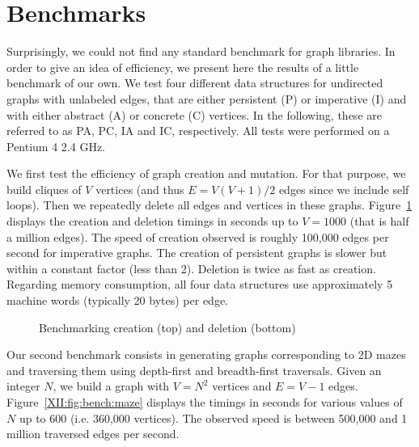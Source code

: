 \section{Benchmarks}\label{XII:bench}

Surprisingly, we could not find any standard benchmark for graph
libraries. In order to give an idea of \ocamlgraph efficiency, we
present here the results of a little benchmark of our own.  We test
four different data structures for undirected graphs with unlabeled
edges, that are either persistent (P) or imperative (I) and with
either abstract (A) or concrete (C) vertices. In the following, these
are referred to as PA, PC, IA and IC, respectively.  All tests were
performed on a Pentium 4 2.4 GHz.

We first test the efficiency of graph creation and mutation.  For that
purpose, we build cliques of $V$ vertices (and thus $E=V(V+1)/2$
edges since we include self loops).  Then we repeatedly delete all
edges and vertices in these graphs.  Figure~\ref{XII:fig:bench:build}
displays the creation and deletion timings in seconds up to $V=1000$
(that is half a million edges).  The speed of creation observed is
roughly 100,000 edges per second for imperative graphs. The creation
of persistent graphs is slower but within a constant factor (less than
2). Deletion is twice as fast as creation.  Regarding memory
consumption, all four data structures use approximately 5 machine words
(typically 20 bytes) per edge.

\begin{figure}
  \centering%
  

  
  \caption{Benchmarking creation (top) and deletion (bottom)}
  \label{XII:fig:bench:build}
\end{figure}

Our second benchmark consists in generating graphs corresponding to 2D
mazes and traversing them using depth-first and breadth-first
traversals. Given an integer $N$, we build a graph with $V=N^2$
vertices and $E=V-1$ edges.  Figure~\ref{XII:fig:bench:maze} displays
the timings in seconds for various values of $N$ up to 600 (i.e.
360,000 vertices). The observed speed is between 500,000 and 1 million
traversed edges per second.

